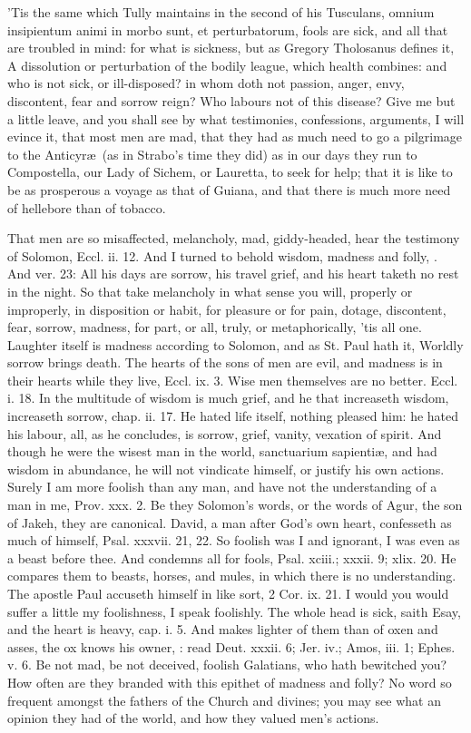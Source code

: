 {'Tis the same which Tully maintains in the second of his Tusculans,
omnium insipientum animi in morbo sunt, et perturbatorum, fools are
sick, and all that are troubled in mind: for what is sickness, but as
Gregory Tholosanus defines it, A dissolution or perturbation of
the bodily league, which health combines: and who is not sick, or
ill-disposed? in whom doth not passion, anger, envy, discontent, fear
and sorrow reign? Who labours not of this disease? Give me but a little
leave, and you shall see by what testimonies, confessions, arguments, I
will evince it, that most men are mad, that they had as much need to go
a pilgrimage to the Anticyr\ae{}\ (as in Strabo's time they did) as in
our days they run to Compostella, our Lady of Sichem, or Lauretta, to
seek for help; that it is like to be as prosperous a voyage as that of
Guiana, and that there is much more need of hellebore than of tobacco.

That men are so misaffected, melancholy, mad, giddy-headed, hear the
testimony of Solomon, Eccl. ii. 12. And I turned to behold wisdom,
madness and folly, \etc. And ver. 23: All his days are sorrow, his travel
grief, and his heart taketh no rest in the night. So that take
melancholy in what sense you will, properly or improperly, in
disposition or habit, for pleasure or for pain, dotage, discontent,
fear, sorrow, madness, for part, or all, truly, or metaphorically, 'tis
all one. Laughter itself is madness according to Solomon, and as St.
Paul hath it, Worldly sorrow brings death. The hearts of the sons of
men are evil, and madness is in their hearts while they live, Eccl. ix.
3. Wise men themselves are no better. Eccl. i. 18. In the multitude of
wisdom is much grief, and he that increaseth wisdom, increaseth sorrow,
chap. ii. 17. He hated life itself, nothing pleased him: he hated his
labour, all, as he concludes, is sorrow, grief, vanity, vexation
of spirit. And though he were the wisest man in the world, sanctuarium
sapienti\ae{}, and had wisdom in abundance, he will not vindicate himself,
or justify his own actions. Surely I am more foolish than any man, and
have not the understanding of a man in me, Prov. xxx. 2. Be they
Solomon's words, or the words of Agur, the son of Jakeh, they are
canonical. David, a man after God's own heart, confesseth as much of
himself, Psal. xxxvii. 21, 22. So foolish was I and ignorant, I was
even as a beast before thee. And condemns all for fools, Psal. xciii.;
xxxii. 9; xlix. 20. He compares them to beasts, horses, and mules, in
which there is no understanding. The apostle Paul accuseth himself in
like sort, 2 Cor. ix. 21. I would you would suffer a little my
foolishness, I speak foolishly. The whole head is sick, saith Esay, and
the heart is heavy, cap. i. 5. And makes lighter of them than of oxen
and asses, the ox knows his owner, \etc: read Deut. xxxii. 6; Jer. iv.;
Amos, iii. 1; Ephes. v. 6. Be not mad, be not deceived, foolish
Galatians, who hath bewitched you? How often are they branded with this
epithet of madness and folly? No word so frequent amongst the fathers
of the Church and divines; you may see what an opinion they had of the
world, and how they valued men's actions.

}

